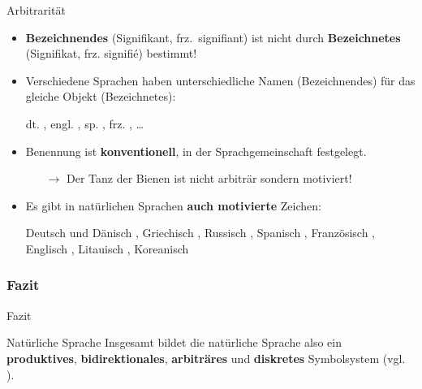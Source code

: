 \begin{frame}{Arbitrarität}

\begin{itemize}
	\item<1-> \textbf{Bezeichnendes} (Signifikant, frz.\ signifiant) ist nicht durch \textbf{Bezeichnetes} (Signifikat, frz. signifié) bestimmt!
	\item[]
	\item<2-> Verschiedene Sprachen haben unterschiedliche Namen (Bezeichnendes) für das gleiche Objekt (Bezeichnetes):

\pause

\ea dt. , engl. , sp. , frz. , \ldots
\z

\pause 

	\item Benennung ist \textbf{konventionell}, \dash in der Sprachgemeinschaft festgelegt.

	\begin{itemize}
		\item[$\rightarrow$] Der Tanz der Bienen ist nicht arbiträr sondern motiviert!
	\end{itemize}

\pause
		
	\item Es gibt in natürlichen Sprachen \textbf{auch motivierte} Zeichen:

\ea Deutsch und Dänisch , Griechisch , Russisch , Spanisch , Französisch , Englisch , Litauisch , Koreanisch 
\z

\end{itemize}

\end{frame}


\subsubsection{Fazit}
\begin{frame}{Fazit}
		
	\begin{block}{Natürliche Sprache}
			Insgesamt bildet die natürliche Sprache also ein \textbf{produktives}, \textbf{bidirektionales}, \textbf{arbiträres} und \textbf{diskretes} Symbolsystem (vgl. \citealp{Luedeling2009a}).
	\end{block}

\end{frame}	
